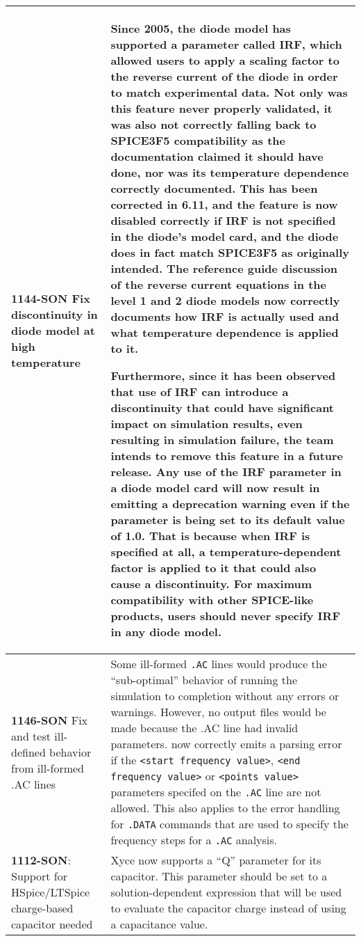{\begin{longtable}[h] {>{\raggedright\small}m{2in}|>{\raggedright\let\\\tabularnewline\small}m{3.5in}}
\textbf{1144-SON} Fix discontinuity in diode model at high temperature & Since
2005, the \Xyce{} diode model has supported a parameter
called \textbf{IRF}, which allowed users to apply a scaling factor to
the reverse current of the diode in order to match experimental data.
Not only was this feature never properly validated, it was also not
correctly falling back to SPICE3F5 compatibility as the documentation
claimed it should have done, nor was its temperature dependence
correctly documented.  This has been corrected in \Xyce{} 6.11, and
the feature is now disabled correctly if \textbf{IRF} is not specified
in the diode's model card, and the diode does in fact match SPICE3F5
as originally intended.  The reference guide discussion of the reverse
current equations in the level 1 and 2 diode models now correctly
documents how \textbf{IRF} is actually used and what temperature
dependence is applied to it.

Furthermore, since it has been observed that use of \textbf{IRF} can
introduce a discontinuity that could have significant impact on
simulation results, even resulting in simulation failure, the \Xyce{}
team intends to remove this feature in a future release.  Any use of
the \textbf{IRF} parameter in a diode model card will now result
in \Xyce{} emitting a deprecation warning even if the parameter is
being set to its default value of 1.0.  That is because
when \textbf{IRF} is specified at all, a temperature-dependent factor
is applied to it that could also cause a discontinuity.  For maximum
compatibility with other SPICE-like products, users should never
specify \textbf{IRF} in any diode model.\\ \hline

\textbf{1146-SON} Fix and test ill-defined behavior from ill-formed .AC lines &
Some ill-formed \texttt{.AC} lines would produce the ``sub-optimal''
behavior of running the simulation to completion without any errors or
warnings.  However, no output files would be made because the .AC line
had invalid parameters.  \Xyce{} now correctly emits a parsing error
if the
\texttt{<start frequency value>}, \texttt{<end frequency value>} or
\texttt{<points value>} parameters specifed on the \texttt{.AC} line are
not allowed. This also applies to the error handling for \texttt{.DATA}
commands that are used to specify the frequency steps for a \texttt{.AC}
analysis.  \\ \hline

\textbf{1112-SON}: Support for HSpice/LTSpice charge-based capacitor needed &
 Xyce now supports a ``Q'' parameter for its capacitor.  This
 parameter should be set to a solution-dependent expression that will
 be used to evaluate the capacitor charge instead of using a
 capacitance value. \\ \hline


\end{longtable}}
